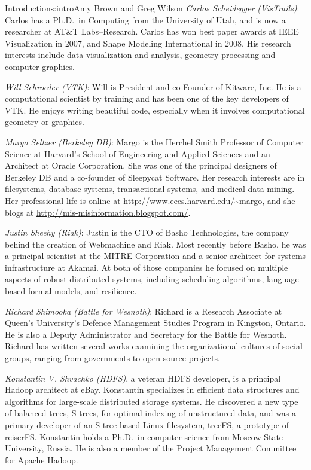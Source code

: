 \begin{aosachapter}{Introduction}{s:intro}{Amy Brown and Greg Wilson}
\emph{Carlos Scheidegger (VisTrails)}: Carlos has a Ph.D.\ in
Computing from the University of Utah, and is now a researcher at
AT\&T Labs--Research. Carlos has won best paper awards at IEEE
Visualization in 2007, and Shape Modeling International in 2008. His
research interests include data visualization and analysis, geometry
processing and computer graphics.

\emph{Will Schroeder (VTK)}: Will is President and
co-Founder of Kitware, Inc. He is a computational scientist by
training and has been one of the key developers of VTK\@. He enjoys
writing beautiful code, especially when it involves computational
geometry or graphics.

\emph{Margo Seltzer (Berkeley DB)}: Margo is the Herchel
Smith Professor of Computer Science at Harvard's School of
Engineering and Applied Sciences and an Architect at Oracle
Corporation.  She was one of the principal designers of Berkeley
DB and a co-founder of Sleepycat Software.  Her research interests
are in filesystems, database systems, transactional systems, and
medical data mining.  Her professional life is online at
\url{http://www.eecs.harvard.edu/~margo}, and she blogs at
\url{http://mis-misinformation.blogspot.com/}.

\emph{Justin Sheehy (Riak)}: Justin is the CTO of Basho
Technologies, the company behind the creation of Webmachine and
Riak. Most recently before Basho, he was a principal scientist at
the MITRE Corporation and a senior architect for systems
infrastructure at Akamai. At both of those companies he focused on
multiple aspects of robust distributed systems, including
scheduling algorithms, language-based formal models, and
resilience.

\emph{Richard Shimooka (Battle for Wesnoth)}: Richard is a Research
Associate at Queen's University's Defence Management Studies Program in
Kingston, Ontario. He is also a Deputy Administrator and Secretary for the
Battle for Wesnoth. Richard has written several works examining the
organizational cultures of social groups, ranging from governments to open
source projects.

\emph{Konstantin V. Shvachko (HDFS)}, a veteran HDFS developer, is a
principal Hadoop architect at eBay. Konstantin specializes in
efficient data structures and algorithms for large-scale distributed
storage systems. He discovered a new type of balanced trees, S-trees,
for optimal indexing of unstructured data, and was a primary developer
of an S-tree-based Linux filesystem, treeFS, a prototype of
reiserFS. Konstantin holds a Ph.D.\ in computer science from Moscow
State University, Russia. He is also a member of the Project
Management Committee for Apache Hadoop.


\end{aosachapter}
